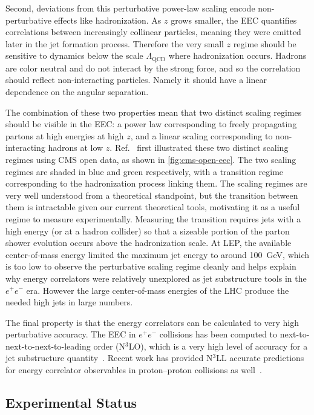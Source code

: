 Second, deviations from this perturbative power-law scaling encode non-perturbative effects like hadronization.
As $z$ grows smaller, the EEC quantifies correlations between increasingly collinear particles, meaning they were emitted later in the jet formation process.
Therefore the very small $z$ regime should be sensitive to dynamics below the scale $\Lambda_{\mathrm{QCD}}$ where hadronization occurs.
Hadrons are color neutral and do not interact by the strong force, and so the correlation should reflect non-interacting particles.
Namely it should have a linear dependence on the angular separation.

The combination of these two properties mean that two distinct scaling regimes should be visible in the EEC: a power law corresponding to freely propagating partons at high energies at high $z$, and a linear scaling corresponding to non-interacting hadrons at low $z$.
Ref.~\cite{Komiske:2022enw} first illustrated these two distinct scaling regimes using CMS open data, as shown in \cref{fig:cms-open-eec}.
The two scaling regimes are shaded in blue and green respectively, with a transition regime corresponding to the hadronization process linking them.
The scaling regimes are very well understood from a theoretical standpoint, but the transition between them is intractable given our current theoretical tools, motivating it as a useful regime to measure experimentally.
Measuring the transition requires jets with a high energy (or \pt at a hadron collider) so that a sizeable portion of the parton shower evolution occurs above the hadronization scale.
At LEP, the available center-of-mass energy limited the maximum jet energy to around 100~GeV, which is too low to observe the perturbative scaling regime cleanly and helps explain why energy correlators were relatively unexplored as jet substructure tools in the $e^+e^-$ era.
However the large center-of-mass energies of the LHC produce the needed high \pt jets in large numbers.

The final property is that the energy correlators can be calculated to very high perturbative accuracy.
The EEC in $e^+e^-$ collisions has been computed to next-to-next-to-next-to-leading order (N$^3$LO), which is a very high level of accuracy for a jet substructure quantity~\cite{Ebert:2020sfi}.
Recent work has provided N$^3$LL accurate predictions for energy correlator observables in proton--proton collisions as well~\cite{Gao:2023ivm}.

\subsection{Experimental Status}

